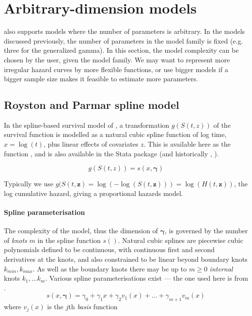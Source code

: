 \documentclass[nojss,nofooter]{jss}
\begin{document}
\section{Arbitrary-dimension models}
\label{sec:adim}

 also supports models where the number of parameters is
arbitrary.  In the models discussed previously, the number of
parameters in the model family is fixed (e.g. three for the
generalized gamma).  In this section, the model complexity can be
chosen by the user, given the model family.  We may want to represent
more irregular hazard curves by more flexible functions, or use bigger
models if a bigger sample size makes it feasible to estimate more
parameters.


\subsection{Royston and Parmar spline model}
\label{sec:spline}

In the spline-based survival model of \citet{royston:parmar}, a
transformation $g(S(t,z))$ of the survival function is modelled as a
natural cubic spline function of log time, $x = \log(t)$, plus linear
effects of covariates $z$.  This is available here as the function
,  and is also available in the Stata package
 \citep{stpm2} (and historically , \citet{stpm:orig,stpm:update}).

  \[g(S(t,z)) = s(x, \bm{\gamma})\]

Typically we use $g(S(t,\mathbf{z}) = \log(-\log(S(t,\mathbf{z}))) =
\log(H(t,\mathbf{z}))$, the log cumulative hazard, giving a
proportional hazards model.    

\paragraph{Spline parameterisation}
The complexity of the model, thus the dimension of $\bm{\gamma}$, is
governed by the number of \emph{knots} $m$ in the spline function
$s()$.  Natural cubic splines are piecewise cubic polynomials defined
to be continuous, with continuous first and second derivatives at the
knots, and also constrained to be linear beyond boundary knots
$k_{min},k_{max}$.  As well as the boundary knots there may be up to
$m\geq 0$ \emph{internal} knots $k_1,\ldots k_m$.  Various spline
parameterisations exist --- the one used here is from
\citet{royston:parmar}.
\begin{equation}
  \label{eq:spline}
  s(x,\bm{\gamma}) = \gamma_0 + \gamma_1 x + \gamma_2 v_1(x) + \ldots + \gamma_{m+1} v_m(x)   
\end{equation}
where $v_j(x)$ is the $j$th \emph{basis} function
\end{document}
